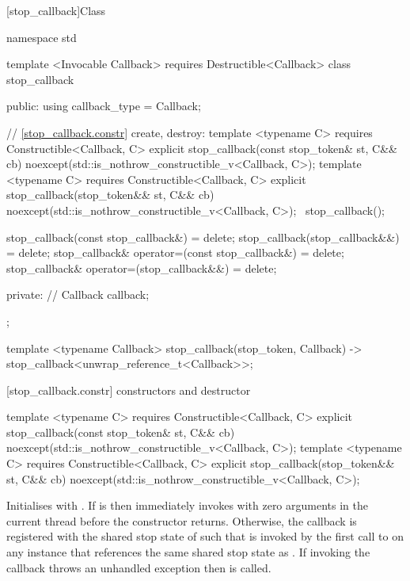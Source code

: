 {%
%
[stop_callback]{Class }

\pnum
{}%

\begin{codeblock}
namespace std {
  template <Invocable Callback>
    requires Destructible<Callback>
  class stop_callback {
  public:
    using callback_type = Callback;

    // \ref{stop_callback.constr} create, destroy:
    template <typename C>
        requires Constructible<Callback, C>
    explicit stop_callback(const stop_token& st, C&& cb)
        noexcept(std::is_nothrow_constructible_v<Callback, C>);
    template <typename C>
        requires Constructible<Callback, C>
    explicit stop_callback(stop_token&& st, C&& cb)
        noexcept(std::is_nothrow_constructible_v<Callback, C>);
    ~stop_callback();

    stop_callback(const stop_callback&) = delete;
    stop_callback(stop_callback&&) = delete;
    stop_callback& operator=(const stop_callback&) = delete;
    stop_callback& operator=(stop_callback&&) = delete;

  private:
    // \expos
    Callback callback; 
  };

  template <typename Callback>
  stop_callback(stop_token, Callback) -> stop_callback<unwrap_reference_t<Callback>>;
}
\end{codeblock}

[stop_callback.constr]{ constructors and destructor}

%
\begin{itemdecl}
template <typename C>
  requires Constructible<Callback, C>
explicit stop_callback(const stop_token& st, C&& cb)
  noexcept(std::is_nothrow_constructible_v<Callback, C>);
template <typename C>
  requires Constructible<Callback, C>
explicit stop_callback(stop_token&& st, C&& cb)
  noexcept(std::is_nothrow_constructible_v<Callback, C>);
\end{itemdecl}
\begin{itemdescr}
  \pnum\effects Initialises  with .
                If  is  then immediately invokes
                with zero arguments in the current thread before the constructor returns.
                Otherwise, the callback is registered with the shared stop state of 
                such that  is invoked by the first call to 
                on any  instance  that references the same shared stop
                state as .
                If invoking the callback throws an unhandled exception then  is called.


\end{itemdescr}}

